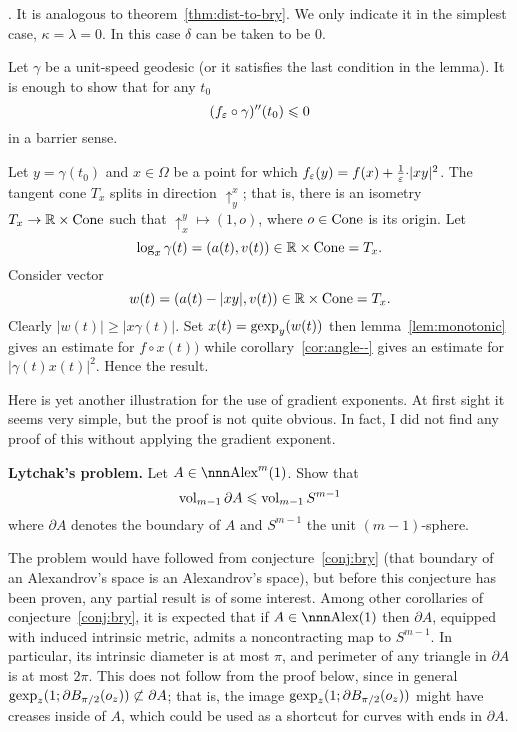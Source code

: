 \documentclass{article}
\begin{document}
\Proof. 
It is analogous to theorem~\ref{thm:dist-to-bry}. 
We only indicate it in the simplest case, $\kappa=\lambda=0$. 
In this case $\delta$ can be taken to be $0$.

Let $\gamma$ be a unit-speed geodesic (or it satisfies the last condition in the lemma). 
It is enough to show that for any $t_0$
$$(f_\varepsilon\circ\gamma)''(t_0)\leqslant0$$
in a barrier sense. 

Let $y=\gamma(t_0)$ and $x\in \Omega$ be a point for which 
$f_\varepsilon(y)=f(x)+\tfrac1{\varepsilon}{\cdot}|x y|^2$.
The tangent cone $T_x$ splits in direction $\uparrow_y^x$;
that is, there is an isometry $T_x\to \mathbb{R}\times \operatorname{Cone}$ such that $\uparrow_x^y\mapsto(1,o)$, 
where $o\in\operatorname{Cone}$ is its origin.
Let 
$$\log_x\gamma(t)=(a(t),v(t))\in\mathbb{R}\times \operatorname{Cone}=T_x.$$
Consider vector 
$$w(t)=(a(t)-|x y|,v(t))\in \mathbb{R}\times \operatorname{Cone}=T_x.$$ 
Clearly $|w(t)|\ge|x\gamma(t)|$.
Set $x(t)=\operatorname{gexp}_y(w(t))$ then lemma~\ref{lem:monotonic} gives an estimate for $f\circ x(t))$ while corollary~\ref{cor:angle--} gives an estimate for $|\gamma(t)x(t)|^2$. Hence the result.
\qeds




Here is yet another illustration for the use of gradient exponents.
At first sight it seems very simple, but the proof is not quite obvious.
In fact, I did not find any proof of this without applying the gradient exponent. 

\begin{thm} {\bf Lytchak's problem.}\label{lyt-prob} Let $A\in\Alex^m(1)$. 
Show
that
$$\operatorname{vol}_{m-1}\partial A\leqslant \operatorname{vol}_{m-1}S^{m-1}$$
where $\partial A$ denotes the boundary of $A$ and $S^{m-1}$ the unit $(m-1)$-sphere.
\end{thm}

The problem would have followed from conjecture~\ref{conj:bry} (that boundary of
an Alexandrov's space is an Alexandrov's space), but before this conjecture has been proven, any partial
result is of some interest.
Among other corollaries of
conjecture~\ref{conj:bry}, it is expected that if $A\in \Alex(1)$ then $\partial
A$, equipped with induced intrinsic metric, admits a noncontracting map to
$S^{m-1}$. 
In particular, its intrinsic diameter is at most $\pi$, and perimeter
of any triangle in $\partial A$ is at most $2\pi$. 
This does not follow from the proof below, 
since in general 
$\operatorname{gexp}_z(1;\partial B_{\pi/2}(o_z))\not\subset\partial A$;
that is, the image $\operatorname{gexp}_z(1;\partial B_{\pi/2}(o_z))$
might have creases inside of $A$, 
which could be used as a shortcut for
curves with ends in $\partial A$.
\end{document}
